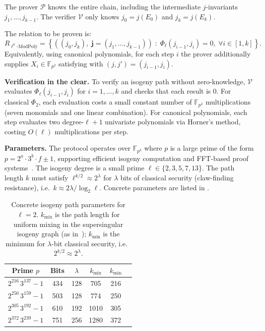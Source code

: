 \documentclass[11pt,a4paper]{article}
\theoremstyle{definition}
\theoremstyle{remark}
\newcommand{\F}{\mathbb{F}}
\newcommand{\calP}{\mathcal{P}}
\newcommand{\calV}{\mathcal{V}}
\newcommand{\polyrel}{\Phi}
\renewcommand{\vec}[1]{\mathbf{#1}}
\begin{document}
The prover $\calP$ knows the entire chain, including the intermediate
$j$-invariants $j_1, \dots, j_{k-1}$. The verifier $\calV$ only knows
$j_0 = j(E_0)$ and $j_k = j(E_k)$.

The relation to be proven is:
\begin{equation}\label{eq:isopath-relation}
	R_{\ell^k\text{-}\mathrm{ModPoly}} = \left\{
		((j_0, j_k),\; \vec{j} = (j_1, \dots, j_{k-1})) \;:\;
		\polyrel_{\ell}(j_{i-1}, j_i) = 0,\; \forall i \in [1, k]
	\right\}.
\end{equation}
Equivalently, using canonical polynomials, for each step $i$ the prover
additionally supplies $X_i \in \F_{p^2}$ satisfying
 with $(j, j') = (j_{i-1}, j_i)$.

\medskip\noindent
\textbf{Verification in the clear.}
To verify an isogeny path without zero-knowledge, $\calV$ evaluates
$\polyrel_{\ell}(j_{i-1}, j_i)$ for $i = 1, \dots, k$ and checks that each
result is $0$. For classical $\polyrel_2$, each evaluation costs a small
constant number of $\F_{p^2}$ multiplications (seven monomials and one
linear combination). For canonical polynomials, each step evaluates two
degree-$\ell+1$ univariate polynomials via Horner's method, costing
$O(\ell)$ multiplications per step.

\medskip\noindent
\textbf{Parameters.}
The protocol operates over $\F_{p^2}$ where $p$ is a large prime of the
form $p = 2^a \cdot 3^b \cdot f \pm 1$, supporting efficient isogeny
computation and FFT-based proof systems~\cite{CLL23}.
The isogeny degree is a small prime $\ell \in \{2, 3, 5, 7, 13\}$.
The path length $k$ must satisfy $\ell^{k/2} \approx 2^{\lambda}$ for
$\lambda$ bits of classical security (claw-finding resistance), i.e.\
$k \approx 2\lambda / \log_2 \ell$. Concrete parameters are listed in
\Cref{tab:isogeny-params}.

\begin{table}[H]
	\centering
	\caption{Concrete isogeny path parameters for $\ell = 2$.
		$k_{\text{mix}}$ is the path length for uniform mixing in the
		supersingular isogeny graph (as in~\cite{CLL23});
		$k_{\text{min}}$ is the minimum for $\lambda$-bit classical security,
		i.e.\ $2^{k/2} \approx 2^{\lambda}$.}
	\label{tab:isogeny-params}
	\begin{tabular}{c c c c c c}
		\toprule
		Prime $p$ & Bits & $\lambda$ & $k_{\text{mix}}$ & $k_{\text{min}}$ \\
		\midrule
		$2^{216} \, 3^{137} - 1$ & 434 & 128 & 705 & 216 \\
		$2^{250} \, 3^{159} - 1$ & 503 & 128 & 774 & 250 \\
		$2^{305} \, 3^{192} - 1$ & 610 & 192 & 1010 & 305 \\
		$2^{372} \, 3^{239} - 1$ & 751 & 256 & 1280 & 372 \\
		\bottomrule
	\end{tabular}
\end{table}
\end{document}

